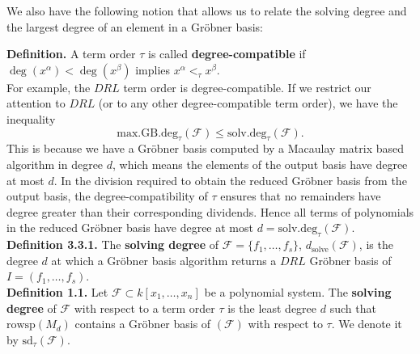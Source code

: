 \documentclass[11pt]{article}
\newcommand{\sdeg}{\text{solv.deg}}
\newcommand{\mdeg}{\text{max.GB.deg}}
\begin{document}
We also have the following notion that allows us to relate the solving degree and the largest degree of an element in a Gröbner basis:

\noindent \textbf{Definition.} A term order $\tau$ is called \textbf{degree-compatible} if $\deg(x^\alpha) < \deg(x^\beta)$ implies $x^\alpha <_\tau x^\beta$. \\

For example, the $DRL$ term order is degree-compatible. If we restrict our attention to $DRL$ (or to any other degree-compatible term order), we have the inequality \[\mdeg_\tau(\mathcal{F}) \leq \sdeg_\tau(\mathcal{F}).\] This is because we have a Gröbner basis computed by a Macaulay matrix based algorithm in degree $d$, which means the elements of the output basis have degree at most $d$. In the division required to obtain the reduced Gröbner basis from the output basis, the degree-compatibility of $\tau$ ensures that no remainders have degree greater than their corresponding dividends. Hence all terms of polynomials in the reduced Gröbner basis have degree at most $d = \sdeg_\tau(\mathcal{F})$. \\

\noindent \textbf{\cite{minko2021security} Definition 3.3.1.} The \textbf{solving degree} of $\mathcal{F} = \{f_1, \dots, f_s\}$, $d_{\text{solve}}(\mathcal{F})$, is the degree $d$ at which a Gröbner basis algorithm returns a $DRL$ Gröbner basis of $I = (f_1, \dots, f_s)$. \\

\noindent \textbf{\cite{caminata2023solving} Definition 1.1.} Let $\mathcal{F} \subset k[x_1, \dots, x_n]$ be a polynomial system. The \textbf{solving degree} of $\mathcal{F}$ with respect to a term order $\tau$ is the least degree $d$ such that $\text{rowsp}(M_d)$ contains a Gröbner basis of $(\mathcal{F})$ with respect to $\tau$. We denote it by $\text{sd}_\tau(\mathcal{F})$. \\
\end{document}
